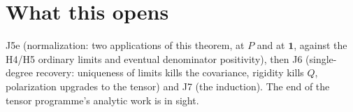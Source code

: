 \documentclass[11pt]{article}
\begin{document}
\section{What this opens}

J5e (normalization: two applications of this theorem, at $P$ and at
$\mathbf{1}$, against the H4/H5 ordinary limits and eventual
denominator positivity), then J6 (single-degree recovery: uniqueness
of limits kills the covariance, rigidity kills $Q$, polarization
upgrades to the tensor) and J7 (the induction). The end of the
tensor programme's analytic work is in sight.
\end{document}
